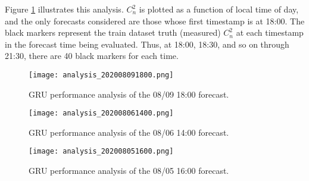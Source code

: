 Figure \ref{fig:analysis_08091800} illustrates this analysis. $C_{n}^{2}$ is plotted as a function of local time of day, and the only forecasts considered are those whose first timestamp is at 18:00. The black markers represent the train dataset truth (measured) $C_{n}^{2}$ at each timestamp in the forecast time being evaluated. Thus, at 18:00, 18:30, and so on through 21:30, there are 40 black markers for each time.
\begin{figure}[h!]
	\centering
	\texttt{[image: analysis\_202008091800.png]}
	\caption{GRU performance analysis of the 08/09 18:00 forecast.}
	\label{fig:analysis_08091800}
\end{figure}

\begin{figure}[h!]
	\centering
	\texttt{[image: analysis\_202008061400.png]}
	\caption{GRU performance analysis of the 08/06 14:00 forecast.}
	\label{fig:analysis_08061400}
\end{figure}

\begin{figure}[h!]
	\centering
	\texttt{[image: analysis\_202008051600.png]}
	\caption{GRU performance analysis of the 08/05 16:00 forecast.}
	\label{fig:analysis_08051600}
\end{figure}